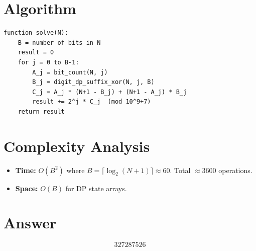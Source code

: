 \documentclass[11pt]{article}
\begin{document}
\section{Algorithm}

\begin{verbatim}
function solve(N):
    B = number of bits in N
    result = 0
    for j = 0 to B-1:
        A_j = bit_count(N, j)
        B_j = digit_dp_suffix_xor(N, j, B)
        C_j = A_j * (N+1 - B_j) + (N+1 - A_j) * B_j
        result += 2^j * C_j  (mod 10^9+7)
    return result
\end{verbatim}

\section{Complexity Analysis}

\begin{itemize}
\item \textbf{Time:} $O(B^2)$ where $B = \lceil \log_2(N+1) \rceil \approx 60$. Total $\approx 3600$ operations.
\item \textbf{Space:} $O(B)$ for DP state arrays.
\end{itemize}

\section{Answer}

\[
\boxed{327287526}
\]
\end{document}
